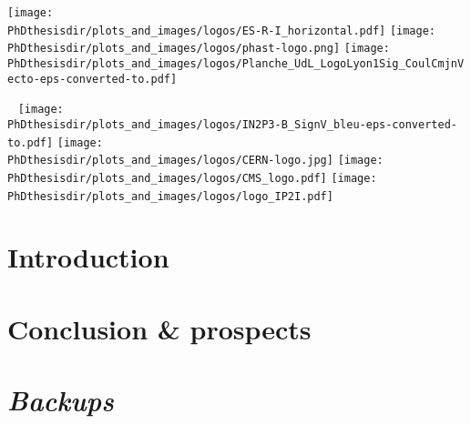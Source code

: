 \documentclass[10pt,aspectratio=169]{beamer}
\newcounter{totalframes}
\begin{document}
\begin{frame}[noframenumbering] \thispagestyle{empty}
\vspace{-.75cm}

\texttt{[image: \\PhDthesisdir/plots\_and\_images/logos/ES-R-I\_horizontal.pdf]}
\hfill
\texttt{[image: \\PhDthesisdir/plots\_and\_images/logos/phast-logo.png]}
\hfill
\texttt{[image: \\PhDthesisdir/plots\_and\_images/logos/Planche\_UdL\_LogoLyon1Sig\_CoulCmjnVecto-eps-converted-to.pdf]}

\vfill

\titlepage

\vfill

~ \hfill
\texttt{[image: \\PhDthesisdir/plots\_and\_images/logos/IN2P3-B\_SignV\_bleu-eps-converted-to.pdf]}
\hfill
\texttt{[image: \\PhDthesisdir/plots\_and\_images/logos/CERN-logo.jpg]}
\hfill
\texttt{[image: \\PhDthesisdir/plots\_and\_images/logos/CMS\_logo.pdf]}
\hfill
\texttt{[image: \\PhDthesisdir/plots\_and\_images/logos/logo\_IP2I.pdf]}
\hfill ~

\vspace{-.5cm}
\end{frame}

\subsection*{}
\section*{Introduction}





\subsection*{}
\section*{Conclusion \& prospects}


\begin{frame}\thispagestyle{empty}
\begin{center}
{\large \color{CERNblue}{Thank you for your attention!}}

\vspace{.25\textheight}
\end{center}
\end{frame}

\setcounter{totalframes}{\theframenumber}

\subsection*{}
\section*{\emph{Backups}}


\setcounter{framenumber}{\thetotalframes}
\end{document}
